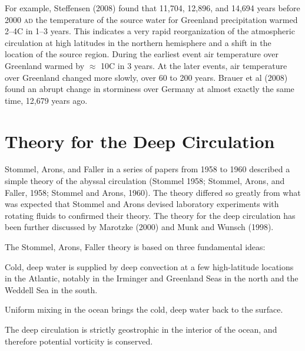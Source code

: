 For example, Steffensen (2008) found that 11,704, 12,896, and 14,694
years before 2000 \textsc{ad} the temperature of the source water for
Greenland precipitation warmed 2--4\degrees C in 1--3 years. This
indicates a very rapid reorganization of the atmospheric circulation
at high latitudes in the northern hemisphere and a shift in the
location of the source region. During the earliest event air
temperature over Greenland warmed by $\approx$ 10\degrees C in 3
years. At the later events, air temperature over Greenland changed
more slowly, over 60 to 200 years. Brauer et al (2008) found an abrupt
change in storminess over Germany at almost exactly the same time,
12,679 years ago.

\section{Theory for the Deep Circulation}
Stommel, Arons,
and Faller in a series of papers from 1958 to 1960 described a simple
theory of the abyssal circulation (Stommel 1958; Stommel, Arons, and Faller,
1958; Stommel and Arons, 1960). The theory differed so greatly from
what was expected that Stommel and Arons devised laboratory
experiments with rotating fluids to confirmed their theory. The theory
for the deep circulation has been further discussed by Marotzke (2000)
and Munk and Wunsch (1998).

The Stommel, Arons, Faller theory is based on three fundamental ideas:
\begin{enumerate}

\vitem Cold, deep water is supplied by deep convection at a few
high-latitude locations in the Atlantic, notably in the Irminger and
Greenland Seas in the north and the Weddell Sea in the south.

\vitem Uniform mixing in the ocean brings
the cold, deep water back to the surface.

\vitem The deep circulation is strictly geostrophic in the
interior of the ocean, and
therefore potential vorticity is conserved.
\end{enumerate}

